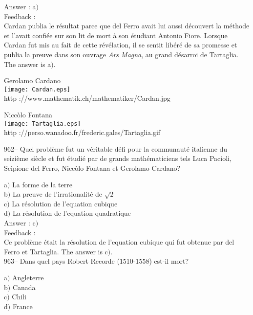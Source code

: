 ﻿\documentclass[letterpaper, 12pt]{article}
\begin{document}
Answer : a$)$\\

Feedback : \\
Cardan publia le r\'esultat parce que del Ferro avait lui aussi
d\'ecouvert la m\'ethode et l'avait confi\'ee sur son lit de mort
\`a son \'etudiant Antonio Fiore. Lorsque Cardan fut mis au fait de
cette r\'ev\'elation, il se sentit lib\'er\'e de sa promesse et
publia la preuve dans son ouvrage
{\sl Ars Magna}, au grand d\'esarroi de Tartaglia. The answer is a$)$.\\

        \begin{center}
        Gerolamo Cardano\\
    \texttt{[image: Cardan.eps]}\\
        {\footnotesize http ://www.mathematik.ch/mathematiker/Cardan.jpg}
    \end{center}

        \begin{center}
        Nicc\`olo Fontana\\
    \texttt{[image: Tartaglia.eps]}\\
        {\footnotesize http
://perso.wanadoo.fr/frederic.gales/Tartaglia.gif}
    \end{center}

962-- Quel probl\`eme fut un v\'eritable d\'efi pour la communaut\'e
italienne du seizi\`eme si\`ecle et fut \'etudi\'e par de grands
math\'ematiciens tels Luca Pacioli, Scipione del Ferro, Nicc\`olo
Fontana et Gerolamo Cardano?

a$)$ La forme de la terre \\
b$)$ La preuve de l'irrationalit\'e de $\sqrt2$ \\
c$)$ La r\'esolution de l'equation cubique  \\
d$)$ La r\'esolution de l'equation quadratique \\

Answer : c$)$\\

Feedback : \\
Ce probl\`eme \'etait la r\'esolution de l'equation cubique qui
fut obtenue
par del Ferro et Tartaglia. The answer is c$)$.\\

963-- Dans quel pays Robert Recorde (1510-1558) est-il mort?

a$)$ Angleterre \\
b$)$ Canada  \\
c$)$ Chili \\
d$)$ France\\
\end{document}
